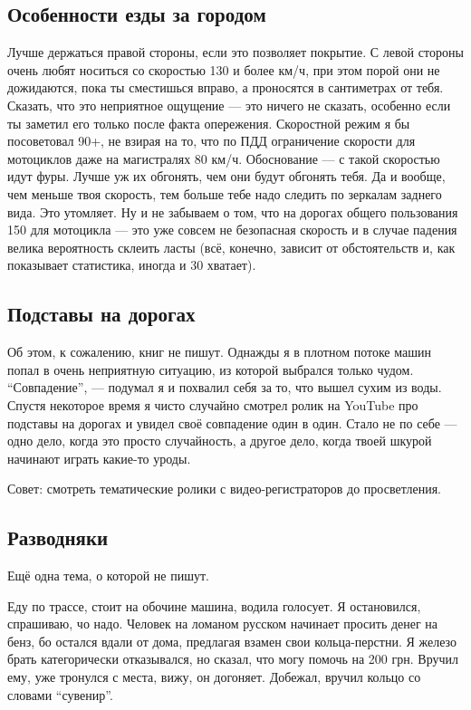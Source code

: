 \documentclass[12pt,a4paper]{article}
\begin{document}
\subsection{Особенности езды за городом}

Лучше держаться правой стороны, если это позволяет покрытие.
С левой стороны очень любят носиться со скоростью 130 и более км/ч,
при этом порой они не дожидаются, пока ты сместишься вправо, а
проносятся в сантиметрах от тебя. Сказать, что это неприятное ощущение ---
это ничего не сказать, особенно если ты заметил его только после факта
опережения. Скоростной режим я бы посоветовал 90+, не взирая на то,
что по ПДД ограничение скорости для мотоциклов даже на магистралях
80 км/ч. Обоснование --- с такой скоростью идут фуры. Лучше уж их обгонять,
чем они будут обгонять тебя. Да и вообще, чем меньше твоя скорость,
тем больше тебе надо следить по зеркалам заднего вида. Это утомляет.
Ну и не забываем о том, что на дорогах общего пользования 150 для
мотоцикла --- это уже совсем не безопасная скорость и в случае
падения велика вероятность склеить ласты (всё, конечно, зависит от
обстоятельств и, как показывает статистика, иногда и 30 хватает).

\subsection{Подставы на дорогах}

Об этом, к сожалению, книг не пишут. Однажды я в плотном потоке
машин попал в очень неприятную ситуацию, из которой выбрался только
чудом. ``Совпадение'', --- подумал я и похвалил себя за то, что вышел
сухим из воды. Спустя некоторое время я чисто случайно смотрел
ролик на YouTube про подставы на дорогах и увидел своё совпадение
один в один. Стало не по себе --- одно дело, когда это просто
случайность, а другое дело, когда твоей шкурой начинают играть
какие-то уроды.

Совет: смотреть тематические ролики с видео-регистраторов до
просветления.

\subsection{Разводняки}

Ещё одна тема, о которой не пишут.

Еду по трассе, стоит на обочине машина, водила голосует.
Я остановился, спрашиваю, чо надо. Человек на ломаном русском
начинает просить денег на бенз, бо остался вдали от дома, предлагая
взамен свои кольца-перстни. Я железо брать категорически отказывался,
но сказал, что могу помочь на 200 грн. Вручил ему, уже тронулся с
места, вижу, он догоняет. Добежал, вручил кольцо со словами ``сувенир''.
\end{document}
